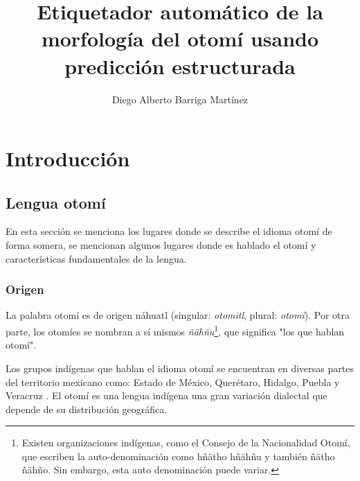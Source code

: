 \documentclass[letterpaper,12pt,oneside]{scrbook}
\theoremstyle{definition}
\begin{document}

	
	\author{Diego Alberto Barriga Martínez}

	\title{Etiquetador automático de la morfología del otomí usando predicción estructurada}

	\tableofcontents

	\maketitle

	


	
	\chapter{Introducción}

	

	
	\section{Lengua otomí}

	
	En esta sección se menciona los lugares donde se describe el idioma otomí de forma somera, se mencionan algunos lugares donde es hablado el otomí y características fundamentales de la lengua.

	
	\subsection{Origen}

	

	La palabra otomí es de origen náhuatl (singular: \textit{otomitl}, plural: \textit{otomí}). Por otra parte, los otomíes se nombran a sí mismos \textit{ñähñu}\footnote{Existen organizaciones indígenas, como el Consejo de la Nacionalidad Otomí, que escriben la auto-denominación como hñätho hñähñu y también ñätho ñähño. Sin embargo, esta auto denominación puede variar.}, que significa "los que hablan otomí".

	
	Los grupos indígenas que hablan el idioma otomí se encuentran en diversas partes del territorio mexicano como: Estado de México, Querétaro, Hidalgo, Puebla y Veracruz \citep{barrientos2004otomies}. El otomí es una lengua indígena una gran variación dialectal que depende de su distribución geográfica.
\end{document}
